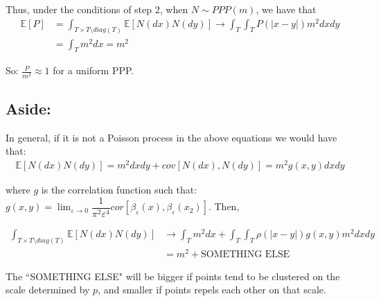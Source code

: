 \documentclass[12pt]{article}
\begin{document}
\noindent Thus, under the conditions of step 2, when $N\sim PPP(m)$, we have that
$$\begin{aligned}
\mathbb{E}[P] &= \int_{T\times T \setminus diag(T)} \mathbb{E}[N(dx)N(dy)] \rightarrow \int_T \int_T P(|x-y|)m^2 dxdy\\
 &= \int_T m^2 dx = m^2
\end{aligned}$$

\noindent So: $\frac{P}{m^2}\approx 1 $ for a uniform PPP.

%

\subsection*{Aside:}
In general, if it is not a Poisson process in the above equations we would have that: 
$$\begin{aligned}
\mathbb{E}[N(dx)N(dy)] = m^2dxdy +  cov[N(dx),N(dy)] = m^2g(x,y)dxdy
\end{aligned}$$

where $g$ is the correlation function such that:
$g(x,y) = \lim_{\varepsilon \to 0} \dfrac{1}{\pi^2\varepsilon^4}cor[\beta_\varepsilon(x),\beta_\varepsilon(x_2)]$. Then,

$$\begin{aligned}
\int_{T\times T \setminus diag(T)}\mathbb{E}[N(dx)N(dy)] &\rightarrow \int_Tm^2dx + \int_T\int_T\rho(|x-y|)g(x,y)m^2dxdy \\
&=  m^2 + \text{SOMETHING ELSE}
\end{aligned}$$

The ``SOMETHING ELSE" will be bigger if points tend to be clustered on the scale determined by $p$, and smaller if points repels each other on that scale.
\end{document}

